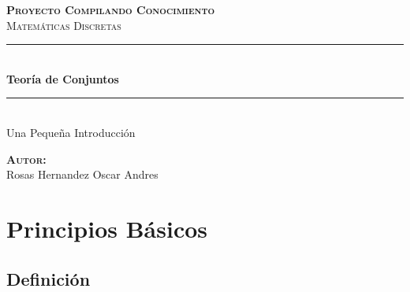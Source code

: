 \documentclass[12pt]{report}                                    %
\author{Oscar Andrés Rosas}                                     %
\begin{document}
\begin{titlepage}

	\center
	\textbf{\textsc{\Large Proyecto Compilando Conocimiento}}\\[1.0cm] 
	\textsc{\Large Matemáticas Discretas}\\[1.0cm] 

	\rule{\linewidth}{0.5mm} \\[1.0cm]
		{ \huge \bfseries Teoría de Conjuntos}\\[1.0cm] 
	\rule{\linewidth}{0.5mm} \\[2.0cm]
	
	{\LARGE Una Pequeña Introducción}\\[7cm] 
	
	\begin{center} \large
	\textbf{\textsc{Autor:}}\\
	Rosas Hernandez Oscar Andres
	\end{center}

	\vfill

\end{titlepage}

\tableofcontents{}
\label{sec:Index}

\clearpage

\chapter{Principios Básicos}
    \clearpage

    \section{Definición}

\end{document}
